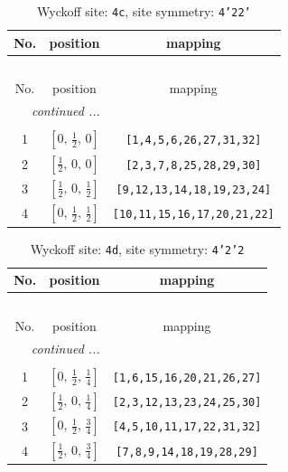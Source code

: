 \documentclass[fleqn,8pt]{jsarticle}
\begin{document}
\renewcommand{\arraystretch}{1.2}
\begin{longtable}{ccc}
\caption{Wyckoff site: {\tt 4c}, site symmetry: {\tt 4'22'}}
 \\
 \hline \hline
No. & position & mapping \\ \hline \endfirsthead

\multicolumn{2}{l}{\tablename\ \thetable{}} \\
 \hline \hline
No. & position & mapping \\ \hline \endhead

 \hline \hline
\multicolumn{2}{r}{\footnotesize\it continued ...} \\ \endfoot

 \hline \hline
\multicolumn{2}{r}{} \\ \endlastfoot

1 & $\left[ 0,\, \frac{1}{2},\, 0 \right]$ & {\tt [1,4,5,6,26,27,31,32]} \\ \hline
2 & $\left[ \frac{1}{2},\, 0,\, 0 \right]$ & {\tt [2,3,7,8,25,28,29,30]} \\ \hline
3 & $\left[ \frac{1}{2},\, 0,\, \frac{1}{2} \right]$ & {\tt [9,12,13,14,18,19,23,24]} \\ \hline
4 & $\left[ 0,\, \frac{1}{2},\, \frac{1}{2} \right]$ & {\tt [10,11,15,16,17,20,21,22]} \\
\end{longtable}
\renewcommand{\arraystretch}{1.2}
\begin{longtable}{ccc}
\caption{Wyckoff site: {\tt 4d}, site symmetry: {\tt 4'2'2}}
 \\
 \hline \hline
No. & position & mapping \\ \hline \endfirsthead

\multicolumn{2}{l}{\tablename\ \thetable{}} \\
 \hline \hline
No. & position & mapping \\ \hline \endhead

 \hline \hline
\multicolumn{2}{r}{\footnotesize\it continued ...} \\ \endfoot

 \hline \hline
\multicolumn{2}{r}{} \\ \endlastfoot

1 & $\left[ 0,\, \frac{1}{2},\, \frac{1}{4} \right]$ & {\tt [1,6,15,16,20,21,26,27]} \\ \hline
2 & $\left[ \frac{1}{2},\, 0,\, \frac{1}{4} \right]$ & {\tt [2,3,12,13,23,24,25,30]} \\ \hline
3 & $\left[ 0,\, \frac{1}{2},\, \frac{3}{4} \right]$ & {\tt [4,5,10,11,17,22,31,32]} \\ \hline
4 & $\left[ \frac{1}{2},\, 0,\, \frac{3}{4} \right]$ & {\tt [7,8,9,14,18,19,28,29]} \\
\end{longtable}
\end{document}
